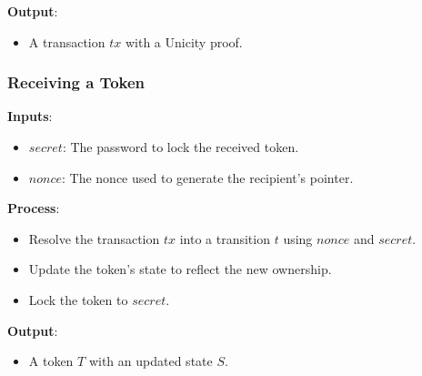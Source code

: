 \noindent\textbf{Output}:
  \begin{itemize}
    \item A transaction \( tx \) with a Unicity proof.
  \end{itemize}

\subsubsection{Receiving a Token}

\noindent\textbf{Inputs}:
  \begin{itemize}
    \item \( secret \): The password to lock the received token.
    \item \( nonce \): The nonce used to generate the recipient's pointer.
  \end{itemize}

\noindent\textbf{Process}:
  \begin{itemize}
    \item Resolve the transaction \( tx \) into a transition \( t \) using \( nonce \) and \( secret \).
    \item Update the token's state to reflect the new ownership.
    \item Lock the token to \( secret \).
  \end{itemize}

\noindent\textbf{Output}:
  \begin{itemize}
    \item A token \( T \) with an updated state \( S \).
  \end{itemize}


